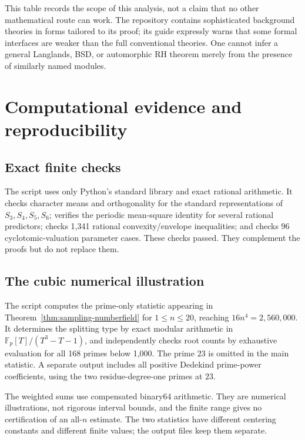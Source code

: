 \documentclass[11pt,letterpaper]{article}
\theoremstyle{definition}
\theoremstyle{remark}
\begin{document}
This table records the scope of this analysis, not a claim that no other
mathematical route can work. The repository contains sophisticated
background theories in forms tailored to its proof; its guide expressly
warns that some formal interfaces are weaker than the full conventional
theories. One cannot infer a general Langlands, BSD, or automorphic RH
theorem merely from the presence of similarly named modules.
\cite{grh-guide,martin}

\section{Computational evidence and reproducibility}

\subsection{Exact finite checks}

The script  uses only Python's standard
library and exact rational arithmetic. It checks character means and
orthogonality for the standard representations of $S_3,S_4,S_5,S_6$;
verifies the periodic mean-square identity for several rational
predictors; checks 1,341 rational convexity/envelope inequalities; and
checks 96 cyclotomic-valuation parameter cases. These checks passed.
They complement the proofs but do not replace them.

\subsection{The cubic numerical illustration}

The script  computes the prime-only
statistic appearing in Theorem~\ref{thm:sampling-numberfield} for
$1\le n\le20$, reaching $16n^4=2{,}560{,}000$. It determines the
splitting type by exact modular arithmetic in
$\mathbb F_p[T]/(T^3-T-1)$, and independently checks root counts by
exhaustive evaluation for all 168 primes below 1,000. The prime $23$ is
omitted in the main statistic. A separate output includes all positive
Dedekind prime-power coefficients, using the two residue-degree-one
primes at $23$.

The weighted sums use compensated binary64 arithmetic. They are
numerical illustrations, not rigorous interval bounds, and the finite
range gives no certification of an all-$n$ estimate. The two statistics
have different centering constants and different finite values; the
output files keep them separate.
\end{document}
